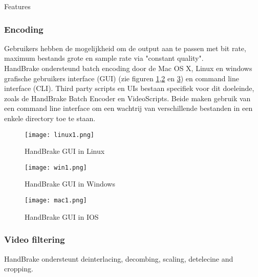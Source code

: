 \begin{subsectionbox}{Features}\end{subsectionbox}
\subsubsection{Encoding}

Gebruikers hebben de mogelijkheid om de output aan te passen met bit rate, maximum bestands grote en sample rate via "constant quality".\\

HandBrake ondersteund batch encoding door de Mac OS X, Linux en windows grafische gebruikers interface (GUI) (zie figuren \ref{fig:Lgui},\ref{fig:Wgui} en \ref{fig:Igui}) en command line interface (CLI). Third party scripts en UIs bestaan specifiek voor dit doeleinde, zoals de HandBrake Batch Encoder en VideoScripts. Beide maken gebruik van een command line interface om een wachtrij van verschillende bestanden in een enkele directory toe te staan.

\begin{figure}[!hp]
\centering
\texttt{[image: linux1.png]}
\caption{HandBrake GUI in Linux}
\label{fig:Lgui}
\end{figure}
\newpage
\begin{figure}[!hp]
\centering
\texttt{[image: win1.png]}
\caption{HandBrake GUI in Windows}
\label{fig:Wgui}
\end{figure}
\begin{figure}[!h]
\centering
\texttt{[image: mac1.png]}
\caption{HandBrake GUI in IOS}
\label{fig:Igui}
\end{figure}
\newpage

\subsubsection{Video filtering}

HandBrake ondersteunt deinterlacing, decombing, scaling, detelecine and cropping.

